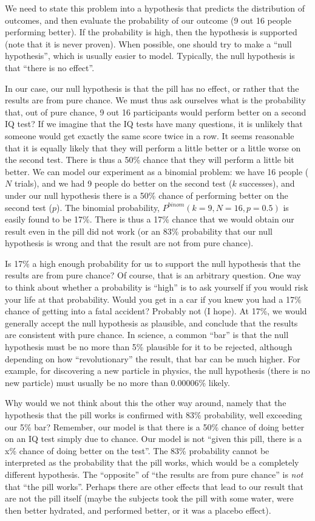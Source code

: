 We need to state this problem into a hypothesis that predicts the distribution of outcomes, and then evaluate the probability of our outcome (9 out 16 people performing better). If the probability is high, then the hypothesis is supported (note that it is never proven). When possible, one should try to make a ``null hypothesis'', which is usually easier to model. Typically, the null hypothesis is that ``there is no effect''.

In our case, our null hypothesis is that the pill has no effect, or rather that the results are from pure chance. We must thus ask ourselves what is the probability that, out of pure chance, 9 out 16 participants would perform better on a second IQ test? If we imagine that the IQ tests have many questions, it is unlikely that someone would get exactly the same score twice in a row. It seems reasonable that it is equally likely that they will perform a little better or a little worse on the second test. There is thus a 50\% chance that they will perform a little bit better. We can model our experiment as a binomial problem: we have 16 people ($N$ trials), and we had 9 people do better on the second test ($k$ successes), and under our null hypothesis there is a 50\% chance of performing better on the second test ($p$). The binomial probability, $P^{binom}(k=9,N=16,p=0.5)$ is easily found to be 17\%. There is thus a 17\% chance that we would obtain our result even in the pill did not work (or an 83\% probability that our null hypothesis is wrong and that the result are not from pure chance).

Is 17\% a high enough probability for us to support the null hypothesis that the results are from pure chance? Of course, that is an arbitrary question. One way to think about whether a probability is ``high'' is to ask yourself if you would risk your life at that probability. Would you get in a car if you knew you had a 17\% chance of getting into a fatal accident? Probably not (I hope). At 17\%, we would generally accept the null hypothesis as plausible, and conclude that the results are consistent with pure chance. In science, a common ``bar'' is that the null hypothesis must be no more than 5\% plausible for it to be rejected, although depending on how ``revolutionary'' the result, that bar can be much higher. For example, for discovering a new particle in physics, the null hypothesis (there is no new particle) must usually be no more than 0.00006\% likely.

Why would we not think about this the other way around, namely that the hypothesis that the pill works is confirmed with 83\% probability, well exceeding our 5\% bar? Remember, our model is that there is a 50\% chance of doing better on an IQ test simply due to chance. Our model is not ``given this pill, there is a x\% chance of doing better on the test''. The 83\% probability cannot be interpreted as the probability that the pill works, which would be a completely different hypothesis. The ``opposite'' of ``the results are from pure chance'' is \textit{not} that ``the pill works''. Perhaps there are other effects that lead to our result that are not the pill itself (maybe the subjects took the pill with some water, were then better hydrated, and performed better, or it was a placebo effect). 


